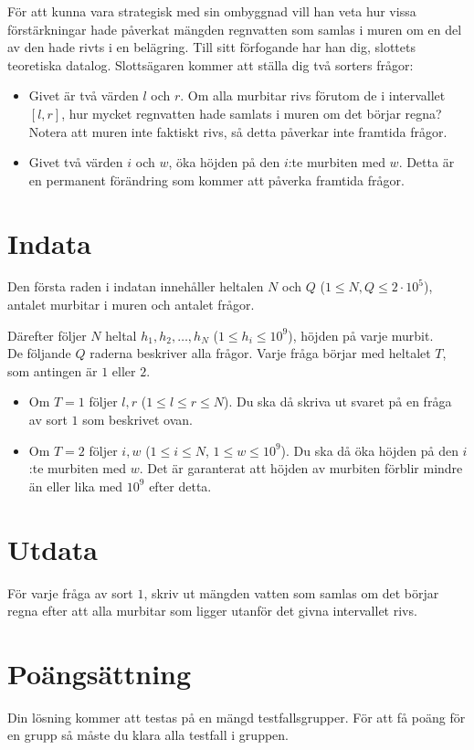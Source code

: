 För att kunna vara strategisk med sin ombyggnad vill han veta hur vissa förstärkningar hade
påverkat mängden regnvatten som samlas i muren om en del av den hade rivts i en belägring.
Till sitt förfogande har han dig, slottets teoretiska datalog.
Slottsägaren kommer att ställa dig två sorters frågor:
\begin{itemize}
  \item Givet är två värden $l$ och $r$. Om alla murbitar rivs förutom de i intervallet 
  $[l,r]$, hur mycket regnvatten hade samlats i muren om det börjar regna?
  Notera att muren inte faktiskt rivs, så detta påverkar inte framtida frågor.
  \item Givet två värden $i$ och $w$, öka höjden på den $i$:te murbiten med $w$. Detta är en
  permanent förändring som kommer att påverka framtida frågor.
\end{itemize}


\section*{Indata}
Den första raden i indatan innehåller heltalen $N$ och $Q$ ($1 \le N, Q \le 2 \cdot 10^5$),
antalet murbitar i muren och antalet frågor.

Därefter följer $N$ heltal $h_1, h_2, \dots, h_N$ ($1 \leq h_i \leq 10^9$), höjden på varje murbit.\\

De följande $Q$ raderna beskriver alla frågor. Varje fråga börjar med heltalet $T$, som antingen är 
$1$ eller $2$.
\begin{itemize}
  \item Om $T=1$ följer $l, r$ ($1 \leq l \leq r \leq N$). Du ska då skriva ut svaret på en fråga av sort $1$ som beskrivet ovan.
  \item Om $T=2$ följer $i, w$ ($1 \leq i \leq N$, $1 \leq w \leq 10^9$). Du ska då öka höjden på den $i$:te murbiten med $w$.
  Det är garanterat att höjden av murbiten förblir mindre än eller lika med $10^9$ efter detta.
\end{itemize}

\section*{Utdata}
För varje fråga av sort $1$, skriv ut mängden vatten som samlas om det börjar regna efter att alla murbitar som ligger utanför
det givna intervallet rivs.

\section*{Poängsättning}
Din lösning kommer att testas på en mängd testfallsgrupper.
För att få poäng för en grupp så måste du klara alla testfall i gruppen.

